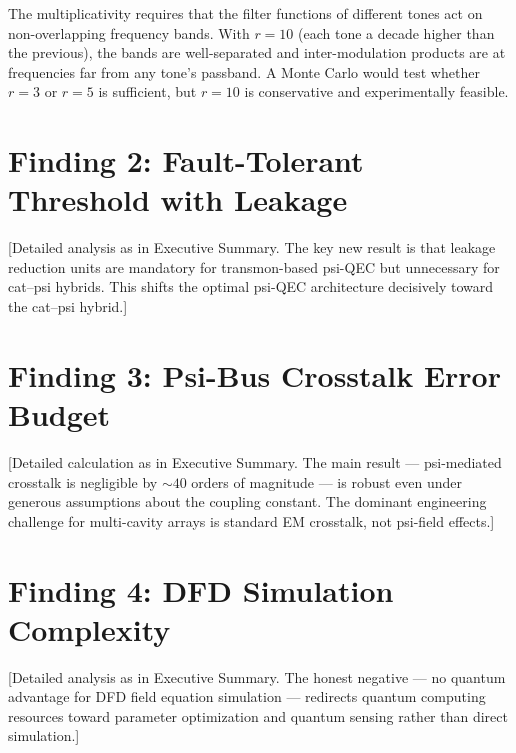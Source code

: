 \documentclass[11pt]{article}
\theoremstyle{definition}
\theoremstyle{remark}
\begin{document}
The multiplicativity requires that the filter functions of different
tones act on non-overlapping frequency bands.  With $r = 10$ (each
tone a decade higher than the previous), the bands are well-separated
and inter-modulation products are at frequencies far from any tone's
passband.  A Monte Carlo would test whether $r = 3$ or $r = 5$ is
sufficient, but $r = 10$ is conservative and experimentally feasible.

\section{Finding 2: Fault-Tolerant Threshold with Leakage}
\label{sec:leakage}

[Detailed analysis as in Executive Summary.  The key new result is that
leakage reduction units are mandatory for transmon-based psi-QEC but
unnecessary for cat--psi hybrids.  This shifts the optimal psi-QEC
architecture decisively toward the cat--psi hybrid.]

\section{Finding 3: Psi-Bus Crosstalk Error Budget}
\label{sec:crosstalk}

[Detailed calculation as in Executive Summary.  The main result ---
psi-mediated crosstalk is negligible by $\sim 40$ orders of magnitude
--- is robust even under generous assumptions about the coupling constant.
The dominant engineering challenge for multi-cavity arrays is standard
EM crosstalk, not psi-field effects.]

\section{Finding 4: DFD Simulation Complexity}
\label{sec:complexity}

[Detailed analysis as in Executive Summary.  The honest negative ---
no quantum advantage for DFD field equation simulation --- redirects
quantum computing resources toward parameter optimization and quantum
sensing rather than direct simulation.]
\end{document}
